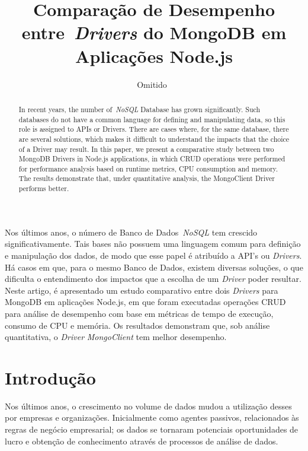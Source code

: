 \documentclass[12pt]{article}
\title{Comparação de Desempenho entre~\emph{Drivers} do MongoDB em Aplicações Node.js}
\author{Omitido~\inst{1}}
\begin{document}
 

\maketitle

\begin{abstract}
In recent years, the number of~\emph{NoSQL} Database has grown significantly. Such databases do not have a common language for defining and manipulating data, so this role is assigned to APIs or Drivers. There are cases where, for the same database, there are several solutions, which makes it difficult to understand the impacts that the choice of a Driver may result. In this paper, we present a comparative study between two MongoDB Drivers in Node.js applications, in which CRUD operations were performed for performance analysis based on runtime metrics, CPU consumption and memory. The results demonstrate that, under quantitative analysis, the MongoClient Driver performs better.
\end{abstract}
     
\begin{resumo} 
Nos últimos anos, o número de Banco de Dados~\emph{NoSQL} tem crescido significativamente. Tais bases não possuem uma linguagem comum para definição e manipulação dos dados, de modo que esse papel é atribuído a API's ou \emph{Drivers}. Há casos em que, para o mesmo Banco de Dados, existem diversas soluções, o que dificulta o entendimento dos impactos que a escolha de um \emph{Driver} poder resultar. Neste artigo, é apresentado um estudo comparativo entre dois \emph{Drivers} para MongoDB em aplicações Node.js, em que foram executadas operações CRUD para análise de desempenho com base em métricas de tempo de execução, consumo de CPU e memória. Os resultados demonstram que, sob análise quantitativa, o \emph{Driver} \emph{MongoClient} tem melhor desempenho.
\end{resumo}


\section{Introdução}
\label{sec:introducao}

Nos últimos anos, o crescimento no volume de dados mudou a utilização desses por empresas e organizações. Inicialmente como agentes passivos, relacionados às regras de negócio empresarial; os dados se tornaram potenciais oportunidades de lucro e obtenção de conhecimento através de processos de análise de dados.
\end{document}
